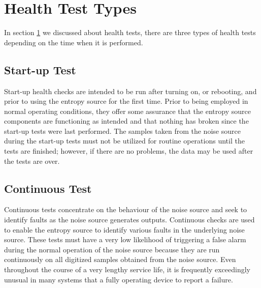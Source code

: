 %
%
\section{Health Test Types}
\label{sec:fundamentals:HTT}
In section \ref{sec:fundamentals:HTT} we discussed about health tests, there are three types of health tests depending on the time when it is performed.

%
%
\subsection{Start-up Test}
\label{subsec:fundamentals:HTT:SUT}
Start-up health checks are intended to be run after turning on, or rebooting, and prior to using the entropy source for the first time. Prior to being employed in normal operating conditions, they offer some assurance that the entropy source components are functioning as intended and that nothing has broken since the start-up tests were last performed. The samples taken from the noise source during the start-up tests must not be utilized for routine operations until the tests are finished; however, if there are no problems, the data may be used after the tests are over.

%
%
\subsection{Continuous Test}
\label{subsec:fundamentals:HTT:CT}
Continuous tests concentrate on the behaviour of the noise source and seek to identify faults as the noise source generates outputs. Continuous checks are used to enable the entropy source to identify various faults in the underlying noise source. These tests must have a very low likelihood of triggering a false alarm during the normal operation of the noise source because they are run continuously on all digitized samples obtained from the noise source. Even throughout the course of a very lengthy service life, it is frequently exceedingly unusual in many systems that a fully operating device to report a failure.

